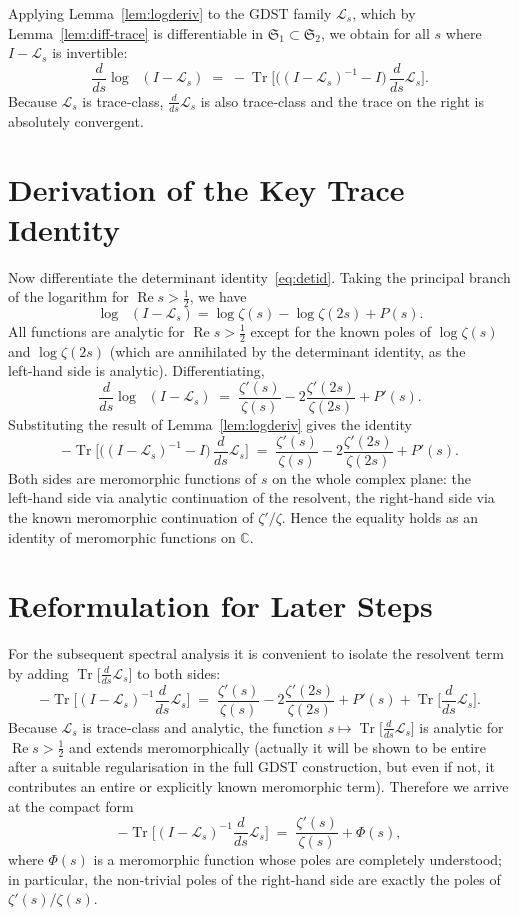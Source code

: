 \documentclass[11pt,a4paper]{article}
\newcommand{\C}{\mathbb{C}}
\newcommand{\LOp}{\mathcal{L}}
\newcommand{\Tr}{\operatorname{Tr}}
\newcommand{\RE}{\operatorname{Re}}
\DeclareMathOperator{\detreg}{det_{(2)}}
\begin{document}
Applying Lemma~\ref{lem:logderiv} to the GDST family $\LOp_s$, which by Lemma~\ref{lem:diff-trace} is differentiable in $\mathfrak{S}_1 \subset \mathfrak{S}_2$, we obtain for all $s$ where $I - \LOp_s$ is invertible:
\[
\frac{d}{ds}\log\detreg(I - \LOp_s) \;=\; -\Tr\!\Big[ \big((I - \LOp_s)^{-1} - I\big)\, \frac{d}{ds}\LOp_s \Big].
\]
Because $\LOp_s$ is trace‑class, $\frac{d}{ds}\LOp_s$ is also trace‑class and the trace on the right is absolutely convergent.

\section{Derivation of the Key Trace Identity}

Now differentiate the determinant identity~\eqref{eq:detid}.  Taking the principal branch of the logarithm for $\RE s > \tfrac12$, we have
\[
\log\detreg(I - \LOp_s) = \log\zeta(s) - \log\zeta(2s) + P(s).
\]
All functions are analytic for $\RE s > \tfrac12$ except for the known poles of $\log\zeta(s)$ and $\log\zeta(2s)$ (which are annihilated by the determinant identity, as the left‑hand side is analytic).  Differentiating,
\[
\frac{d}{ds}\log\detreg(I - \LOp_s) \;=\; \frac{\zeta'(s)}{\zeta(s)} - 2\frac{\zeta'(2s)}{\zeta(2s)} + P'(s).
\]
Substituting the result of Lemma~\ref{lem:logderiv} gives the identity
\begin{equation}\label{eq:traceid1}
-\Tr\!\Big[ \big((I - \LOp_s)^{-1} - I\big)\, \frac{d}{ds}\LOp_s \Big]
\;=\; \frac{\zeta'(s)}{\zeta(s)} - 2\frac{\zeta'(2s)}{\zeta(2s)} + P'(s).
\end{equation}
Both sides are meromorphic functions of $s$ on the whole complex plane: the left‑hand side via analytic continuation of the resolvent, the right‑hand side via the known meromorphic continuation of $\zeta'/\zeta$.  Hence the equality holds as an identity of meromorphic functions on $\C$.

\section{Reformulation for Later Steps}

For the subsequent spectral analysis it is convenient to isolate the resolvent term by adding $\Tr\big[\frac{d}{ds}\LOp_s\big]$ to both sides:
\[
-\Tr\!\Big[ (I - \LOp_s)^{-1} \frac{d}{ds}\LOp_s \Big]
\;=\; \frac{\zeta'(s)}{\zeta(s)} - 2\frac{\zeta'(2s)}{\zeta(2s)} + P'(s) + \Tr\!\Big[\frac{d}{ds}\LOp_s\Big].
\]
Because $\LOp_s$ is trace‑class and analytic, the function $s \mapsto \Tr\big[\frac{d}{ds}\LOp_s\big]$ is analytic for $\RE s > \tfrac12$ and extends meromorphically (actually it will be shown to be entire after a suitable regularisation in the full GDST construction, but even if not, it contributes an entire or explicitly known meromorphic term).  Therefore we arrive at the compact form
\begin{equation}\label{eq:traceid2}
-\Tr\!\Big[ (I - \LOp_s)^{-1} \frac{d}{ds}\LOp_s \Big]
\;=\; \frac{\zeta'(s)}{\zeta(s)} + \Phi(s),
\end{equation}
where $\Phi(s)$ is a meromorphic function whose poles are completely understood; in particular, the non‑trivial poles of the right‑hand side are exactly the poles of $\zeta'(s)/\zeta(s)$.
\end{document}
